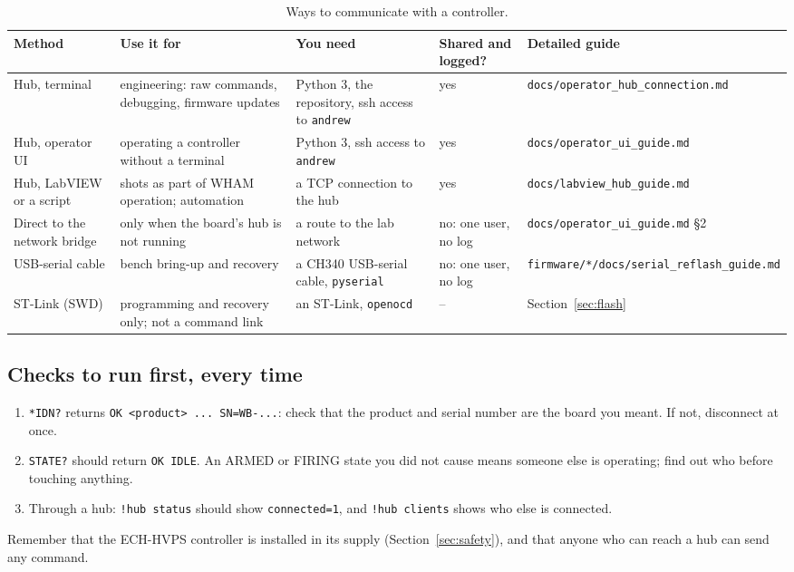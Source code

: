 \documentclass[11pt]{article}
\newcommand{\code}[1]{\texttt{#1}}
\newcommand{\file}[1]{\nolinkurl{#1}}
\begin{document}
\begin{table}[H]
  \centering
  \begin{tabular}{L{0.85in} L{1.1in} L{0.95in} L{0.7in} L{1.05in}}
    \hline
    \textbf{Method} & \textbf{Use it for} & \textbf{You need} & \textbf{Shared and logged?} & \textbf{Detailed guide} \\
    \hline
    Hub, terminal & engineering: raw commands, debugging, firmware updates & Python 3, the repository, ssh access to \code{andrew} & yes & \file{docs/operator_hub_connection.md} \\
    Hub, operator UI & operating a controller without a terminal & Python 3, ssh access to \code{andrew} & yes & \file{docs/operator_ui_guide.md} \\
    Hub, LabVIEW or a script & shots as part of WHAM operation; automation & a TCP connection to the hub & yes & \file{docs/labview_hub_guide.md} \\
    Direct to the network bridge & only when the board's hub is not running & a route to the lab network & no: one user, no log & \file{docs/operator_ui_guide.md} \S2 \\
    USB-serial cable & bench bring-up and recovery & a CH340 USB-serial cable, \code{pyserial} & no: one user, no log & \file{firmware/*/docs/serial_reflash_guide.md} \\
    ST-Link (SWD) & programming and recovery only; not a command link & an ST-Link, \code{openocd} & -- & Section~\ref{sec:flash} \\
    \hline
  \end{tabular}
  \caption{Ways to communicate with a controller.}
  \label{tab:connect}
\end{table}

\subsection{Checks to run first, every time}
\label{app:connect-checks}
\begin{enumerate}
  \item \code{*IDN?} returns \code{OK <product> ... SN=WB-...}: check that the product and serial number are the board you meant. If not, disconnect at once.
  \item \code{STATE?} should return \code{OK IDLE}. An ARMED or FIRING state you did not cause means someone else is operating; find out who before touching anything.
  \item Through a hub: \code{!hub status} should show \code{connected=1}, and \code{!hub clients} shows who else is connected.
\end{enumerate}
Remember that the ECH-HVPS controller is installed in its supply (Section~\ref{sec:safety}), and that anyone who can reach a hub can send any command.
\end{document}
